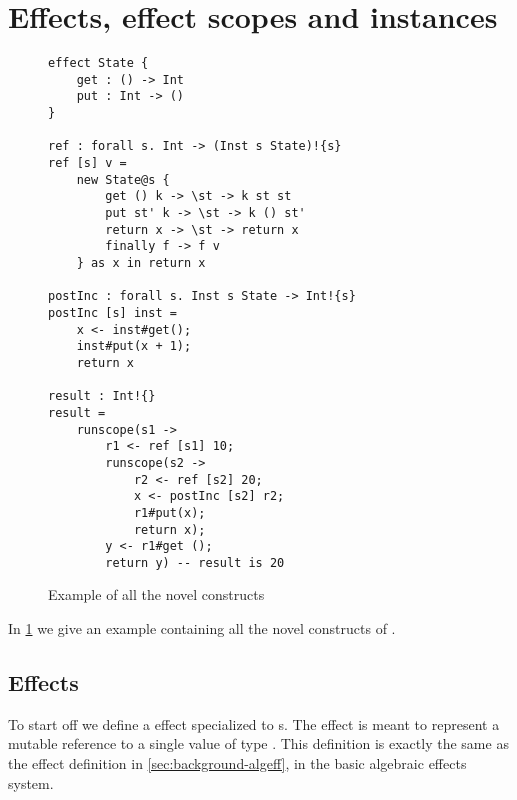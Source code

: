 \section{Effects, effect scopes and instances}
\label{sec:lang-basics}

\begin{figure}
\caption{Example of all the novel constructs}
\begin{verbatim}
effect State {
	get : () -> Int
	put : Int -> ()
}

ref : forall s. Int -> (Inst s State)!{s}
ref [s] v =
	new State@s {
		get () k -> \st -> k st st
		put st' k -> \st -> k () st'
		return x -> \st -> return x
		finally f -> f v
	} as x in return x

postInc : forall s. Inst s State -> Int!{s}
postInc [s] inst =
	x <- inst#get();
	inst#put(x + 1);
	return x

result : Int!{}
result =
	runscope(s1 ->
		r1 <- ref [s1] 10;
		runscope(s2 ->
			r2 <- ref [s2] 20;
			x <- postInc [s2] r2;
			r1#put(x);
			return x);
		y <- r1#get ();
		return y) -- result is 20
\end{verbatim}
\label{fig:example1}
\end{figure}

In \cref{fig:example1} we give an example containing all the novel constructs of \lang{}.

\subsection{Effects}

To start off we define a  effect specialized to s.
The  effect is meant to represent a mutable reference to a single value of type .
This definition is exactly the same as the  effect definition in \cref{sec:background-algeff}, in the basic algebraic effects system.

